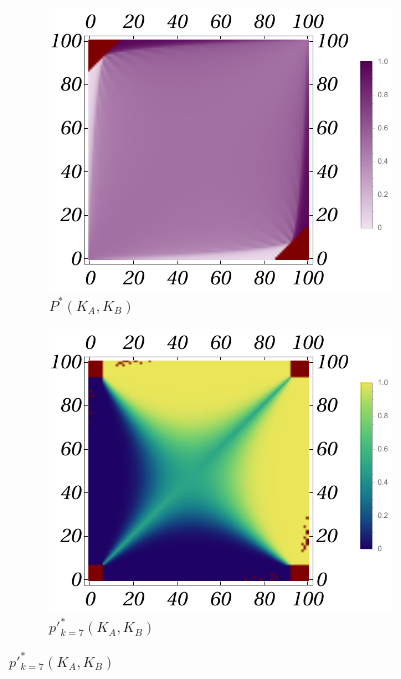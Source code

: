 \documentclass{article}
\theoremstyle{definition}
\begin{document}
\begin{figure}[H]
    \centering
    \begin{subfigure}[b]{0.24\textwidth}
        \includegraphics[width=\textwidth]{img/PB_Plot_15_100.pdf}
        \caption{$P^*(K_A,K_B)$}
        \label{fig:BGame15__100_P}
    \end{subfigure}
    \hfill %
    \begin{subfigure}[b]{0.24\textwidth}
        \includegraphics[width=\textwidth]{img/ppkB_Plot_15_7_100.pdf}
        \caption{$p'^*_{k=7}(K_A,K_B)$}

\end{subfigure}
\end{figure}
\end{document}
